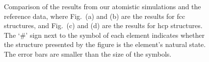 \documentclass[%
 reprint,
 amsmath,amssymb,
 aps,
]{revtex4-1}
\begin{document}
\noindent\begin{figure}
\centering
\noindent\ignorespaces
{}
\newline
{}
\newline
{}
\newline
{}
\caption{\label{fig:compare}
 Comparison of the results from our atomistic simulations and the reference data, where Fig.~(a) and (b) are the results for fcc structures, and Fig.~(c) and (d) are the results for hcp structures.
 The `\#' sign next to the symbol of each element indicates whether the structure presented by the figure is the element's natural state.
 The error bars are smaller than the size of the symbols.
}
\end{figure}
\end{document}
